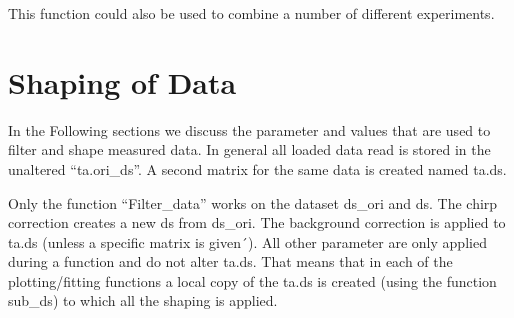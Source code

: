 \documentclass[letterpaper,10pt,english]{sphinxmanual}
\begin{document}
This function could also be used to combine a number of different experiments.


\chapter{Shaping of Data}
\label{\detokenize{Shaping:shaping-of-data}}\label{\detokenize{Shaping::doc}}
In the Following sections we discuss the parameter and values that are used to
filter and shape measured data. In general all loaded data read is
stored in the un\sphinxhyphen{}altered “ta.ori\_ds”. A second matrix for the same data
is created named ta.ds.

Only the function “Filter\_data” works on the dataset ds\_ori and ds.
The chirp correction creates a new ds from ds\_ori.
The background correction is applied to ta.ds (unless a
specific matrix is given´). All other parameter are only applied during a
function and do not alter ta.ds. That means that in each of the
plotting/fitting functions a local copy of the ta.ds is created (using
the function sub\_ds) to which all the shaping is applied.
\end{document}
